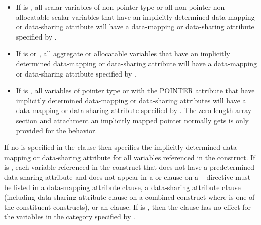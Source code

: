 \begin{itemize}

  \item If  is , all scalar variables of
    non-pointer type or all non-pointer non-allocatable scalar variables that
    have an implicitly determined data-mapping or data-sharing attribute will
    have a data-mapping or data-sharing attribute specified by
    .

  \item  If  is  or ,
    all aggregate or allocatable variables that have an implicitly determined
    data-mapping or data-sharing attribute will have a data-mapping or
    data-sharing attribute specified by .

  \item If  is , all variables of pointer
    type or with the POINTER attribute that have implicitly determined
    data-mapping or data-sharing attributes will have a data-mapping or
    data-sharing attribute specified by .  The
    zero-length array section and attachment an implicitly mapped pointer
    normally gets is only provided for the  behavior.

\end{itemize}
 
If no  is specified in the clause then
 specifies the implicitly determined data-mapping or
data-sharing attribute for all variables referenced in the construct.  If
 is , each variable referenced in the
construct that does not have a predetermined data-sharing attribute and does
not appear in a  or  clause on a ~
directive must be listed in a data-mapping attribute clause, a data-sharing
attribute clause (including data-sharing attribute clause on a combined
construct where  is one of the constituent constructs), or
an  clause. If  is ,
then the clause has no effect for the variables in the category specified by
.

